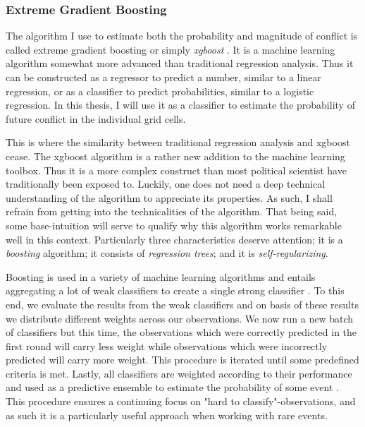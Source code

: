\documentclass[a4paper]{article}
\begin{document}
\subsubsection{Extreme Gradient Boosting}\label{xgboost}

The algorithm I use to estimate both the probability and magnitude of conflict is called extreme gradient boosting or simply \emph{xgboost} \citep{Chen_2016}. It is a machine learning algorithm somewhat more advanced than traditional regression analysis. Thus it can be constructed as a regressor to predict a number, similar to a linear regression, or as a classifier to predict probabilities, similar to a logistic regression. In this thesis, I will use it as a classifier to estimate the probability of future conflict in the individual grid cells.\par

This is where the similarity between traditional regression analysis and xgboost cease. The xgboost algorithm is a rather new addition to the machine learning toolbox. Thus it is a more complex construct than most political scientist have traditionally been exposed to. Luckily, one does not need a deep technical understanding of the algorithm to appreciate its properties. As such, I shall refrain from getting into the technicalities of the algorithm. That being said, some base-intuition will serve to qualify why this algorithm works remarkable well in this context. Particularly three characteristics deserve attention; it is a \emph{boosting} algorithm; it consists of \emph{regression trees}; and it is \emph{self-regularizing}.\par

Boosting is used in a variety of machine learning algorithms and entails aggregating a lot of weak classifiers to create a single strong classifier \citep[337]{Friedman_2001}. To this end, we evaluate the results from the weak classifiers and on basis of these results we distribute different weights across our observations. We now run a new batch of classifiers but this time, the observations which were correctly predicted in the first round will carry less weight while observations which were incorrectly predicted will carry more weight. This procedure is iterated until some predefined criteria is met. Lastly, all classifiers are weighted according to their performance and used as a predictive ensemble to estimate the probability of some event \citep[338-339]{Friedman_2001}. This procedure ensures a continuing focus on "hard to classify"-observations, and as such it is a particularly useful approach when working with rare events.\par
\end{document}
